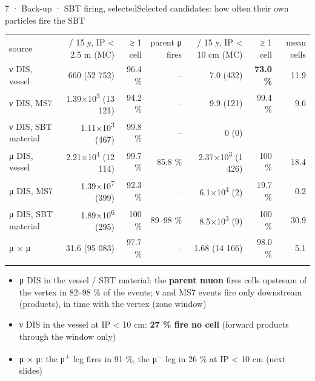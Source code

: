 \begin{btframe}{7 · Back-up · SBT firing, selected}{Selected candidates: how often their own particles fire the SBT}
{\fontsize{4.55pt}{5.92pt}\selectfont\setlength{\tabcolsep}{2.6pt}\renewcommand{\arraystretch}{1.36}
\begin{tabularx}{\linewidth}{>{\raggedright\arraybackslash}Xrrrrrr}
\textcolor{muted}{source} & \textcolor{muted}{/ 15 y, IP < 2.5 m (MC)} & \textcolor{muted}{≥ 1 cell} & \textcolor{muted}{parent μ fires} & \textcolor{muted}{/ 15 y, IP < 10 cm (MC)} & \textcolor{muted}{≥ 1 cell} & \textcolor{muted}{mean cells} \\\headrule
ν DIS, vessel & 660 (52 752) & 96.4 \% & -- & 7.0 (432) & \textbf{73.0 \%} & 11.9 \\\rowrule
ν DIS, MS7 & 1.39×10\textsuperscript{3} (13 121) & 94.2 \% & -- & 9.9 (121) & 99.4 \% & 9.6 \\\rowrule
ν DIS, SBT material & 1.11×10\textsuperscript{3} (467) & 99.8 \% & -- & 0 (0) & & \\\rowrule
μ DIS, vessel & 2.21×10\textsuperscript{4} (12 114) & 99.7 \% & 85.8 \% & 2.37×10\textsuperscript{3} (1 426) & 100 \% & 18.4 \\\rowrule
μ DIS, MS7 & 1.39×10\textsuperscript{7} (399) & 92.3 \% & -- & 6.1×10\textsuperscript{4} (2) & 19.7 \% & 0.2 \\\rowrule
μ DIS, SBT material & 1.89×10\textsuperscript{6} (295) & 100 \% & 89--98 \% & 8.5×10\textsuperscript{3} (9) & 100 \% & 30.9 \\\rowrule
μ × μ & 31.6 (95 083) & 97.7 \% & -- & 1.68 (14 166) & 98.0 \% & 5.1 \\\rowrule
\end{tabularx}\par}
\vspace{3pt}
{\fontsize{6.15pt}{8.60pt}\selectfont
\begin{itemize}
  \item μ DIS in the vessel / SBT material: the \textbf{parent muon} fires cells upstream of the vertex in 82--98 \% of the events; ν and MS7 events fire only downstream (products), in time with the vertex (zone window)
  \item ν DIS in the vessel at IP < 10 cm: \textbf{27 \% fire no cell} (forward products through the window only)
  \item μ × μ: the μ\textsuperscript{+} leg fires in 91 \%, the μ\textsuperscript{−} leg in 26 \% at IP < 10 cm (next slides)
\end{itemize}}
\end{btframe}

